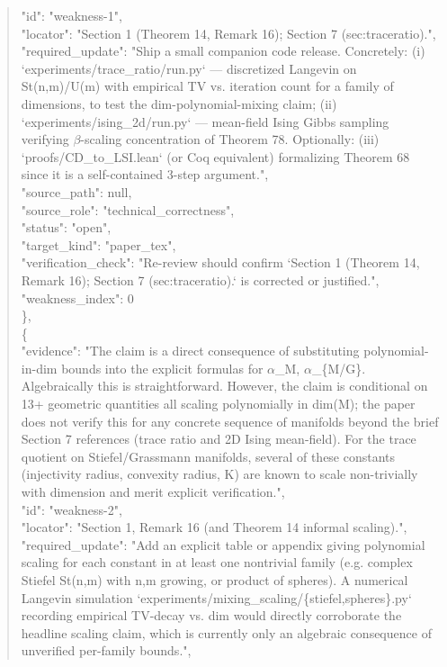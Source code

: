 \documentclass[11pt]{article}
\begin{document}
\begin{quote}
      "id": "weakness-1",\\
      "locator": "Section 1 (Theorem 14, Remark 16); Section 7 (sec:traceratio).",\\
      "required\_update": "Ship a small companion code release. Concretely: (i) `experiments/trace\_ratio/run.py` --- discretized Langevin on St(n,m)/U(m) with empirical TV vs. iteration count for a family of dimensions, to test the dim-polynomial-mixing claim; (ii) `experiments/ising\_2d/run.py` --- mean-field Ising Gibbs sampling verifying \ensuremath{\beta}-scaling concentration of Theorem 78. Optionally: (iii) `proofs/CD\_to\_LSI.lean` (or Coq equivalent) formalizing Theorem 68 since it is a self-contained 3-step argument.",\\
      "source\_path": null,\\
      "source\_role": "technical\_correctness",\\
      "status": "open",\\
      "target\_kind": "paper\_tex",\\
      "verification\_check": "Re-review should confirm `Section 1 (Theorem 14, Remark 16); Section 7 (sec:traceratio).` is corrected or justified.",\\
      "weakness\_index": 0\\
    \},\\
    \{\\
      "evidence": "The claim is a direct consequence of substituting polynomial-in-dim bounds into the explicit formulas for \ensuremath{\alpha}\_M, \ensuremath{\alpha}\_\{M/G\}. Algebraically this is straightforward. However, the claim is conditional on 13+ geometric quantities all scaling polynomially in dim(M); the paper does not verify this for any concrete sequence of manifolds beyond the brief Section 7 references (trace ratio and 2D Ising mean-field). For the trace quotient on Stiefel/Grassmann manifolds, several of these constants (injectivity radius, convexity radius, K) are known to scale non-trivially with dimension and merit explicit verification.",\\
      "id": "weakness-2",\\
      "locator": "Section 1, Remark 16 (and Theorem 14 informal scaling).",\\
      "required\_update": "Add an explicit table or appendix giving polynomial scaling for each constant in at least one nontrivial family (e.g. complex Stiefel St(n,m) with n,m growing, or product of spheres). A numerical Langevin simulation `experiments/mixing\_scaling/\{stiefel,spheres\}.py` recording empirical TV-decay vs. dim would directly corroborate the headline scaling claim, which is currently only an algebraic consequence of unverified per-family bounds.",\\

\end{quote}
\end{document}
